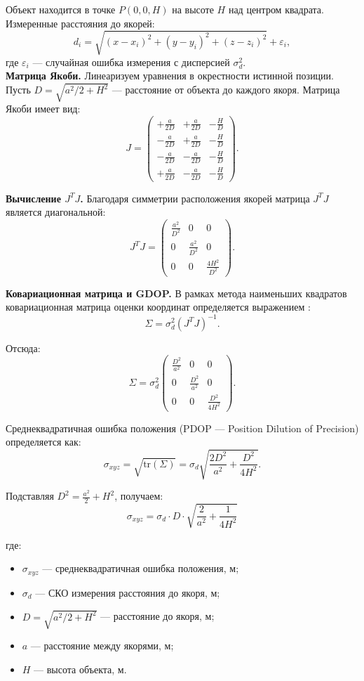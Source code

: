 \documentclass[a4paper,11pt]{article} %
\begin{document}
Объект находится в точке $P(0, 0, H)$ на высоте $H$ над центром квадрата. Измеренные расстояния до якорей:
$$
d_i = \sqrt{(x-x_i)^2 + (y-y_i)^2 + (z-z_i)^2} + \varepsilon_i,
$$
где $\varepsilon_i$ — случайная ошибка измерения с дисперсией $\sigma_d^2$.
\\

\textbf{Матрица Якоби.} Линеаризуем уравнения в окрестности истинной позиции. Пусть $D = \sqrt{a^2/2 + H^2}$ — расстояние от объекта до каждого якоря. Матрица Якоби имеет вид:
$$
J =
\begin{pmatrix}
+\frac{a}{2D} & +\frac{a}{2D} & -\frac{H}{D} \\
-\frac{a}{2D} & +\frac{a}{2D} & -\frac{H}{D} \\
-\frac{a}{2D} & -\frac{a}{2D} & -\frac{H}{D} \\
+\frac{a}{2D} & -\frac{a}{2D} & -\frac{H}{D}
\end{pmatrix}.
$$

\textbf{Вычисление $J^T J$.} Благодаря симметрии расположения якорей матрица $J^T J$ является диагональной:
$$
J^T J =
\begin{pmatrix}
\frac{a^2}{D^2} & 0 & 0 \\
0 & \frac{a^2}{D^2} & 0 \\
0 & 0 & \frac{4H^2}{D^2}
\end{pmatrix}.
$$

\textbf{Ковариационная матрица и GDOP.} В рамках метода наименьших квадратов ковариационная матрица оценки координат определяется выражением \cite{hayes1996,kay1993}:
$$
\Sigma = \sigma_d^2 (J^T J)^{-1}.
$$

Отсюда:
$$
\Sigma = \sigma_d^2
\begin{pmatrix}
\frac{D^2}{a^2} & 0 & 0 \\
0 & \frac{D^2}{a^2} & 0 \\
0 & 0 & \frac{D^2}{4H^2}
\end{pmatrix}.
$$

Среднеквадратичная ошибка положения (PDOP — Position Dilution of Precision) определяется как:
$$
\sigma_{xyz} = \sqrt{\mathrm{tr}(\Sigma)} = \sigma_d \sqrt{\frac{2D^2}{a^2} + \frac{D^2}{4H^2}}.
$$

Подставляя $D^2 = \frac{a^2}{2} + H^2$, получаем:
$$
\boxed{
\sigma_{xyz} = \sigma_d \cdot D \cdot \sqrt{\frac{2}{a^2} + \frac{1}{4H^2}}
}
$$

где:
\begin{itemize}
    \item $\sigma_{xyz}$ — среднеквадратичная ошибка положения, м;
    \item $\sigma_d$ — СКО измерения расстояния до якоря, м;
    \item $D = \sqrt{a^2/2 + H^2}$ — расстояние до якоря, м;
    \item $a$ — расстояние между якорями, м;
    \item $H$ — высота объекта, м.
\end{itemize}
\end{document}

